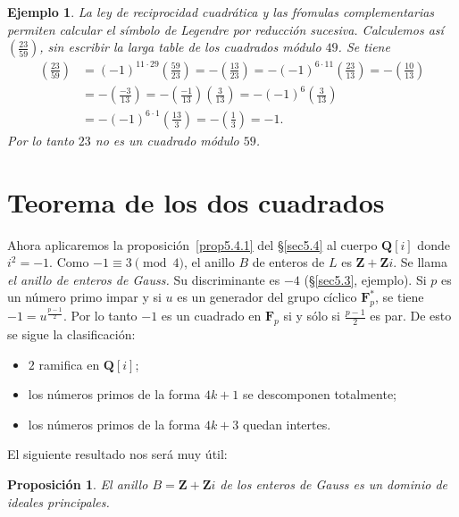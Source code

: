 \documentclass[oneside,bibtotoc,leqno,spanish]{amsbook}
\newcommand{\QQ}{\mathbf{Q}}
\newcommand{\ZZ}{\mathbf{Z}}
\newcommand{\FF}{\mathbf{F}}
\newcommand{\leg}[2]{\left(\frac{#1}{#2}\right)}
\numberwithin{equation}{section}
\theoremstyle{defi}
\theoremstyle{note}
\newtheorem{proposition}{Proposici\'on}
\theoremstyle{rem}
\newtheorem*{example*}{Ejemplo}
\newtheorem*{remark*}{Observaci\'on}
\numberwithin{theorem}{section}
\numberwithin{proposition}{section}
\numberwithin{definition}{section}
\numberwithin{lemma}{section}
\numberwithin{corollary}{section}
\numberwithin{example}{section}
\numberwithin{footnote}{section}%
\begin{document}
\begin{example*}
La ley de reciprocidad cuadr\'atica y las f\'romulas complementarias permiten calcular el s\'imbolo de Legendre por
reducci\'on sucesiva. Calculemos as\'i $\leg{23}{59}$, sin escribir la larga table de los cuadrados
m\'odulo $49$. Se tiene
\begin{align*}
\leg{23}{59} &= (-1)^{11\cdot 29}\leg{59}{23} = -\leg{13}{23} = -(-1)^{6\cdot 11}\leg{23}{13}=-\leg{10}{13}\\
&= -\leg{-3}{13} = -\leg{-1}{13}\leg{3}{13} =-(-1)^{6}\leg{3}{13}\\
&=-(-1)^{6\cdot 1}\leg{13}{3}=-\leg{1}{3}=-1.
\end{align*}
Por lo tanto $23$ no es un cuadrado m\'odulo $59$.
\end{example*}

\section{Teorema de los dos cuadrados}\label{sec5.6}

Ahora aplicaremos la proposici\'on~\ref{prop5.4.1} del \S\ref{sec5.4} al cuerpo $\QQ[i]$ donde $i^{2}=-1$. Como $-1\equiv 3\pmod 4$,
el anillo $B$ de enteros de $L$ es $\ZZ+\ZZ i$. Se llama {\em el anillo de enteros de Gauss.} Su discriminante
es $-4$ (\S\ref{sec5.3}, ejemplo). Si $p$ es un n\'umero primo impar y si $u$ es un generador del grupo c\'iclico
$\FF_{p}^{*}$, se tiene $-1=u^{\frac{p-1}{2}}$. Por lo tanto $-1$ es un cuadrado en $\FF_{p}$ si y s\'olo si
$\frac{p-1}{2}$ es par. De esto se sigue la clasificaci\'on:
\begin{itemize}
\item $2$ ramifica en $\QQ[i]$;
\item los n\'umeros primos de la forma $4k+1$ se descomponen totalmente;
\item los n\'umeros primos de la forma $4k+3$ quedan intertes.
\end{itemize}
El siguiente resultado nos ser\'a muy \'util:

\begin{proposition}\label{prop5.6.1}
El anillo $B = \ZZ+\ZZ i$ de los enteros de Gauss es un dominio de ideales principales.
\end{proposition}
\end{document}
